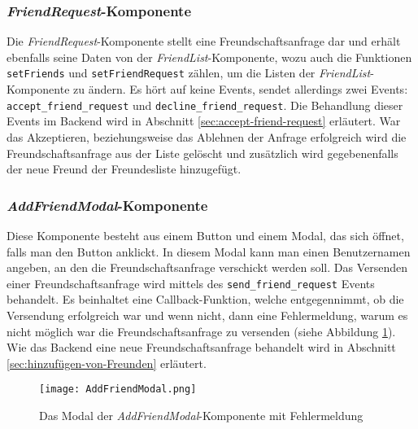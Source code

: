 \subsubsection{\textit{FriendRequest}-Komponente}
Die \textit{FriendRequest}-Komponente stellt eine Freundschaftsanfrage dar und erhält ebenfalls seine Daten von der \textit{FriendList}-Komponente, wozu auch die Funktionen \verb|setFriends| und \verb|setFriendRequest| zählen, um die Listen der \textit{FriendList}-Komponente zu ändern.
Es hört auf keine Events, sendet allerdings zwei Events: \verb|accept_friend_request| und \verb|decline_friend_request|. Die Behandlung dieser Events im Backend wird in Abschnitt \ref{sec:accept-friend-request} erläutert. War das Akzeptieren, beziehungsweise das Ablehnen der Anfrage erfolgreich wird die Freundschaftsanfrage aus der Liste gelöscht und zusätzlich wird gegebenenfalls der neue Freund der Freundesliste hinzugefügt.

\subsubsection{\textit{AddFriendModal}-Komponente}
Diese Komponente besteht aus einem Button und einem Modal, das sich öffnet, falls man den Button anklickt. In diesem Modal kann man einen Benutzernamen angeben, an den die Freundschaftsanfrage verschickt werden soll. Das Versenden einer Freundschaftsanfrage wird mittels des \verb|send_friend_request| Events behandelt. Es beinhaltet eine Callback-Funktion, welche entgegennimmt, ob die Versendung erfolgreich war und wenn nicht, dann eine Fehlermeldung, warum es nicht möglich war die Freundschaftsanfrage zu versenden (siehe Abbildung \ref{fig:AddFriendModal}). Wie das Backend eine neue Freundschaftsanfrage behandelt wird in Abschnitt \ref{sec:hinzufügen-von-Freunden} erläutert.

\begin{figure}[h]
\centering
\texttt{[image: AddFriendModal.png]}
\caption{Das Modal der \textit{AddFriendModal}-Komponente mit Fehlermeldung}
\label{fig:AddFriendModal}
\end{figure}

